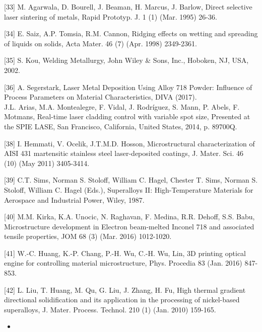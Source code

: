 \documentclass[10pt]{article}
\begin{document}
[33] M. Agarwala, D. Bourell, J. Beaman, H. Marcus, J. Barlow, Direct selective laser sintering of metals, Rapid Prototyp. J. 1 (1) (Mar. 1995) 26-36.

[34] E. Saiz, A.P. Tomsia, R.M. Cannon, Ridging effects on wetting and spreading of liquids on solids, Acta Mater. 46 (7) (Apr. 1998) 2349-2361.

[35] S. Kou, Welding Metallurgy, John Wiley \& Sons, Inc., Hoboken, NJ, USA, 2002.

[36] A. Segerstark, Laser Metal Deposition Using Alloy 718 Powder: Influence of Process Parameters on Material Characteristics, DIVA (2017).\\
[37] J.L. Arias, M.A. Montealegre, F. Vidal, J. Rodríguez, S. Mann, P. Abels, F. Motmans, Real-time laser cladding control with variable spot size, Presented at the SPIE LASE, San Francisco, California, United States, 2014, p. 89700Q.

[38] I. Hemmati, V. Ocelik, J.T.M.D. Hosson, Microstructural characterization of AISI 431 martensitic stainless steel laser-deposited coatings, J. Mater. Sci. 46 (10) (May 2011) 3405-3414.

[39] C.T. Sims, Norman S. Stoloff, William C. Hagel, Chester T. Sims, Norman S. Stoloff, William C. Hagel (Eds.), Superalloys II: High-Temperature Materials for Aerospace and Industrial Power, Wiley, 1987.

[40] M.M. Kirka, K.A. Unocic, N. Raghavan, F. Medina, R.R. Dehoff, S.S. Babu, Microstructure development in Electron beam-melted Inconel 718 and associated tensile properties, JOM 68 (3) (Mar. 2016) 1012-1020.

[41] W.-C. Huang, K.-P. Chang, P.-H. Wu, C.-H. Wu, Lin, 3D printing optical engine for controlling material microstructure, Phys. Procedia 83 (Jan. 2016) 847-853.

[42] L. Liu, T. Huang, M. Qu, G. Liu, J. Zhang, H. Fu, High thermal gradient directional solidification and its application in the processing of nickel-based superalloys, J. Mater. Process. Technol. 210 (1) (Jan. 2010) 159-165.

\begin{itemize}
  \item 
\end{itemize}
\end{document}
